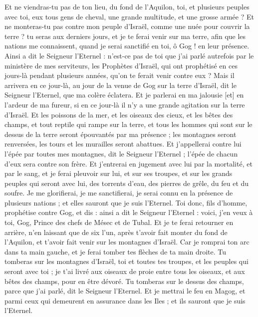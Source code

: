 \begin{multicols}{2}
Et ne viendras-tu pas de ton lieu, du fond de l'Aquilon, toi, et plusieurs peuples avec toi, eux tous gens de cheval, une grande multitude, et une grosse armée ?
Et ne monteras-tu pas contre mon peuple d'Israël, comme une nuée pour couvrir la terre ? tu seras aux derniers jours, et je te ferai venir sur ma terre, afin que les nations me connaissent, quand je serai sanctifié en toi, ô Gog ! en leur présence.
Ainsi a dit le Seigneur l'Eternel : n'est-ce pas de toi que j'ai parlé autrefois par le ministère de mes serviteurs, les Prophètes d'Israël, qui ont prophétisé en ces jours-là pendant plusieurs années, qu'on te ferait venir contre eux ?
Mais il arrivera en ce jour-là, au jour de la venue de Gog sur la terre d'Israël, dit le Seigneur l'Eternel, que ma colère éclatera.
Et je parlerai en ma jalousie [et] en l'ardeur de ma fureur, si en ce jour-là il n'y a une grande agitation sur la terre d'Israël.
Et les poissons de la mer, et les oiseaux des cieux, et les bêtes des champs, et tout reptile qui rampe sur la terre, et tous les hommes qui sont sur le dessus de la terre seront épouvantés par ma présence ; les montagnes seront renversées, les tours et les murailles seront abattues.
Et j'appellerai contre lui l'épée par toutes mes montagnes, dit le Seigneur l'Eternel ; l'épée de chacun d'eux sera contre son frère.
Et j'entrerai en jugement avec lui par la mortalité, et par le sang, et je ferai pleuvoir sur lui, et sur ses troupes, et sur les grands peuples qui seront avec lui, des torrents d'eau, des pierres de grêle, du feu et du soufre.
Je me glorifierai, je me sanctifierai, je serai connu en la présence de plusieurs nations ; et elles sauront que je suis l'Eternel.
\VerseOne{}Toi donc, fils d'homme, prophétise contre Gog, et dis : ainsi a dit le Seigneur l'Eternel : voici, j'en veux à toi, Gog, Prince des chefs de Mésec et de Tubal.
Et je te ferai retourner en arrière, n'en laissant que de six l'un, après t'avoir fait monter du fond de l'Aquilon, et t'avoir fait venir sur les montagnes d'Israël.
Car je romprai ton arc dans ta main gauche, et je ferai tomber tes flèches de ta main droite.
Tu tomberas sur les montagnes d'Israël, toi et toutes tes troupes, et les peuples qui seront avec toi ; je t'ai livré aux oiseaux de proie entre tous les oiseaux, et aux bêtes des champs, pour en être dévoré.
Tu tomberas sur le dessus des champs, parce que j'ai parlé, dit le Seigneur l'Eternel.
Et je mettrai le feu en Magog, et parmi ceux qui demeurent en assurance dans les Iles ; et ils sauront que je suis l'Eternel.

\end{multicols}

